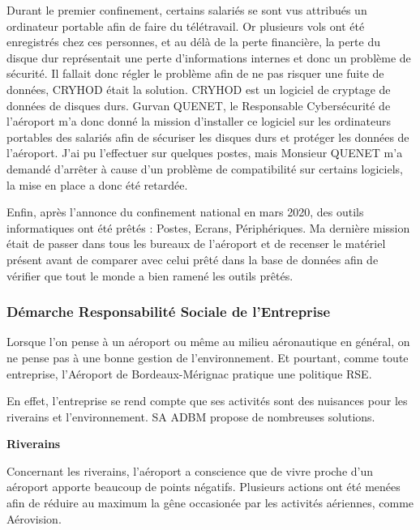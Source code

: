 Durant le premier confinement, certains salariés se sont vus attribués un ordinateur portable afin de faire du télétravail. Or plusieurs vols ont été enregistrés chez ces personnes, et au délà de la perte financière, la perte du disque dur représentait une perte d'informations internes et donc un problème de sécurité.
Il fallait donc régler le problème afin de ne pas risquer une fuite de données, CRYHOD était la solution. CRYHOD est un logiciel de cryptage de données de disques durs.
Gurvan QUENET, le Responsable Cybersécurité de l'aéroport m'a donc donné la mission d'installer ce logiciel sur les ordinateurs portables des salariés afin de sécuriser les disques durs et protéger les données de l'aéroport.
J'ai pu l'effectuer sur quelques postes, mais Monsieur QUENET m'a demandé d'arrêter à cause d'un problème de compatibilité sur certains logiciels, la mise en place a donc été retardée.\newline

Enfin, après l'annonce du confinement national en mars 2020, des outils informatiques ont été prêtés : Postes, Ecrans, Périphériques.
Ma dernière mission était de passer dans tous les bureaux de l'aéroport et de recenser le matériel présent avant de comparer avec celui prêté dans la base de données afin de vérifier que tout le monde a bien ramené les outils prêtés.

\newpage

\subsubsection*{Démarche Responsabilité Sociale de l’Entreprise}


Lorsque l'on pense à un aéroport ou même au milieu aéronautique en général, on ne pense pas à une bonne gestion de l'environnement.
Et pourtant, comme toute entreprise, l'Aéroport de Bordeaux-Mérignac pratique une politique RSE.


En effet, l'entreprise se rend compte que ses activités sont des nuisances pour les riverains et l'environnement. SA ADBM propose de nombreuses solutions.\newline

\textbf{Riverains}\newline

Concernant les riverains, l'aéroport a conscience que de vivre proche d'un aéroport apporte beaucoup de points négatifs.
Plusieurs actions ont été menées afin de réduire au maximum la gêne occasionée par les activités aériennes, comme Aérovision.

